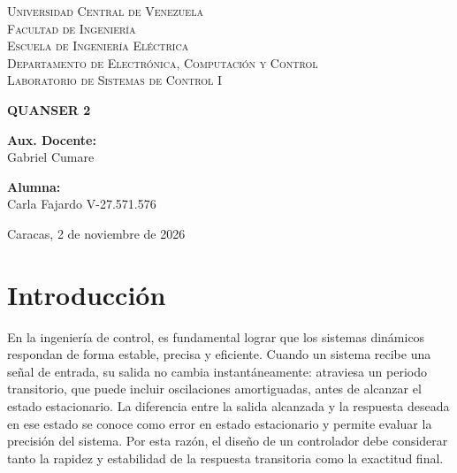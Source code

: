 \documentclass[12pt]{article}
\begin{document}
\renewcommand{\tablename}{Tabla}
\thispagestyle{empty}

\begin{center}
    \textsc{Universidad Central de Venezuela}\\[0.35cm]
    \textsc{Facultad de Ingenier\'ia}\\[0.35cm]
    \textsc{Escuela de Ingenier\'ia El\'ectrica}\\[0.35cm]
    \textsc{Departamento de Electr\'onica, Computaci\'on y Control}\\[0.35cm]
    \textsc{Laboratorio de Sistemas de Control I}
\end{center}

\vspace{5.5cm}

\begin{center}
    \textbf{QUANSER 2}
\end{center}

\vfill

\noindent
\begin{minipage}[t]{0.48\textwidth}
    \textbf{Aux. Docente:}\\[0.20cm]
    Gabriel Cumare
\end{minipage}%
\hfill
\begin{minipage}[t]{0.48\textwidth}
    \raggedleft
    \textbf{Alumna:}\\[0.20cm]
    Carla Fajardo V-27.571.576
\end{minipage}

\vspace{0.8cm}

\begin{center}
    Caracas, 2 de noviembre de 2026
\end{center}

\newpage
\tableofcontents
\newpage

\section{Introducci\'on}
En la ingenier\'ia de control, es fundamental lograr que los sistemas din\'amicos respondan de forma estable, precisa y eficiente. Cuando un sistema recibe una se\~nal de entrada, su salida no cambia instant\'aneamente: atraviesa un periodo transitorio, que puede incluir oscilaciones amortiguadas, antes de alcanzar el estado estacionario. La diferencia entre la salida alcanzada y la respuesta deseada en ese estado se conoce como error en estado estacionario y permite evaluar la precisi\'on del sistema. Por esta raz\'on, el dise\~no de un controlador debe considerar tanto la rapidez y estabilidad de la respuesta transitoria como la exactitud final.
\end{document}
